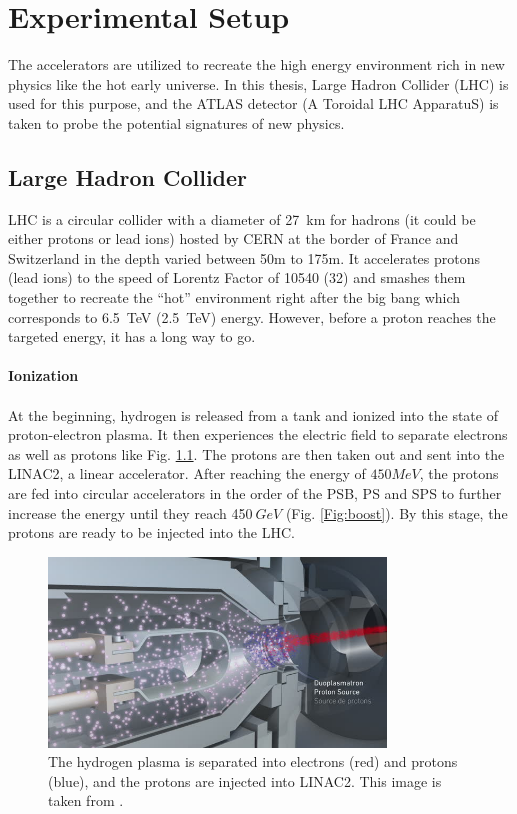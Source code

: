 \chapter{Experimental Setup}
\label{chap:exp}
The accelerators are utilized to recreate the high energy environment rich in new physics like the hot early universe. In this thesis, Large Hadron Collider (LHC) is used for this purpose, and the ATLAS detector (A Toroidal LHC ApparatuS) is taken to probe the potential signatures of new physics. 
\section{Large Hadron Collider\cite{LHC}}
LHC is a circular collider with a diameter of 27~km for hadrons (it could be either protons or lead ions) hosted by CERN at the border of France and Switzerland in the depth varied between 50m to 175m. It accelerates protons (lead ions) to the speed of Lorentz Factor of 10540 (32) and smashes them together to recreate the ``hot'' environment right after the big bang which corresponds to 6.5~TeV (2.5~TeV) energy. However, before a proton reaches the targeted energy, it has a long way to go.
\\
\\{\bf Ionization}
\\
\\At the beginning, hydrogen is released from a tank and ionized into the state of proton-electron plasma. It then experiences the electric field to separate electrons as well as protons like Fig. \ref{Fig:ionization}. The protons are then taken out and sent into the LINAC2, a linear accelerator. After reaching the energy of $450MeV$, the protons are fed into circular accelerators in the order of the PSB, PS and SPS to further increase the energy until they reach 450$~GeV$ (Fig. \ref{Fig:boost}). By this stage, the protons are ready to be injected into the LHC.
\begin{figure}[!h]                
	\includegraphics[width=0.8\textwidth]{Chapter2/ionization.png}
	\centering
	\begin{center}
		\caption{The hydrogen plasma is separated into electrons (red) and protons (blue), and the protons are injected into LINAC2. This image is taken from \cite{Ionization}.}
		\label{Fig:ionization}            
	\end{center}
\end{figure}
